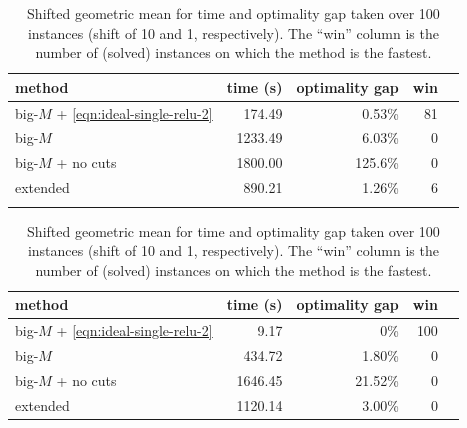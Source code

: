\documentclass[smallextended]{svjour3}
\newcommand{\blue}[1]{{#1}}
\begin{document}
\begin{table}[tb]
    \centering
    \begin{subtable}{\linewidth}
    \centering
    \label{tab:small-relu}
    \begin{tabular}{lrrrr}
        \toprule
        method & time (s) & optimality gap & win \\ \midrule
        big-$M$ + \eqref{eqn:ideal-single-relu-2} &  174.49 & 0.53\% & 81 \\ 
        big-$M$  & 1233.49 & 6.03\% &  0 \\
        big-$M$ + no cuts & 1800.00 & 125.6\% & 0 \\
        extended &  890.21 & 1.26\% &  6 \\
        \bottomrule \\
    \end{tabular}
    \end{subtable}
    \bigskip
    \begin{subtable}{\linewidth}
    \centering
    \label{tab:small-relu-l1}
    \begin{tabular}{lrrrr}
        \toprule
        method & time (s) & optimality gap & win \\ \midrule
        big-$M$ + \eqref{eqn:ideal-single-relu-2} & \blue{9.17} & \blue{0\%} & 100 \\ 
        big-$M$  & \blue{434.72} & \blue{1.80\%} & 0 \\
        big-$M$ + no cuts & \blue{1646.45} & \blue{21.52\%} & 0 \\
        extended & \blue{1120.14} & \blue{3.00\%} & 0 \\
        \bottomrule
    \end{tabular}
    \end{subtable}
    \caption{Shifted geometric mean for time and optimality gap taken over 100 instances (shift of 10 and 1, respectively). The ``win'' column is the number of (solved) instances on which the method is the fastest.}
\end{table}
\end{document}
